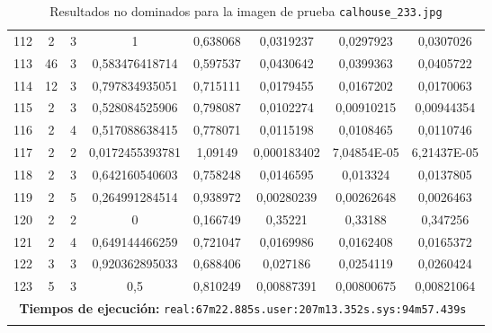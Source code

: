 \begin{longtable}{|c|c|c|c|c|c|c|c|}
112 & 2 & 3 & 1 & 0,638068 & 0,0319237 & 0,0297923 & 0,0307026  \\
113 & 46 & 3 & 0,583476418714 & 0,597537 & 0,0430642 & 0,0399363 & 0,0405722  \\
114 & 12 & 3 & 0,797834935051 & 0,715111 & 0,0179455 & 0,0167202 & 0,0170063  \\
115 & 2 & 3 & 0,528084525906 & 0,798087 & 0,0102274 & 0,00910215 & 0,00944354  \\
116 & 2 & 4 & 0,517088638415 & 0,778071 & 0,0115198 & 0,0108465 & 0,0110746  \\
117 & 2 & 2 & 0,0172455393781 & 1,09149 & 0,000183402 & 7,04854E-05 & 6,21437E-05  \\
118 & 2 & 3 & 0,642160540603 & 0,758248 & 0,0146595 & 0,013324 & 0,0137805  \\
119 & 2 & 5 & 0,264991284514 & 0,938972 & 0,00280239 & 0,00262648 & 0,0026463  \\
120 & 2 & 2 & 0 & 0,166749 & 0,35221 & 0,33188 & 0,347256  \\
121 & 2 & 4 & 0,649144466259 & 0,721047 & 0,0169986 & 0,0162408 & 0,0165372  \\
122 & 3 & 3 & 0,920362895033 & 0,688406 & 0,027186 & 0,0254119 & 0,0260424  \\
123 & 5 & 3 & 0,5 & 0,810249 & 0,00887391 & 0,00800675 & 0,00821064  \\
\hline
\multicolumn{8}{|c|}{\textbf{Tiempos de ejecución:} \texttt{real:67m22.885s.user:207m13.352s.sys:94m57.439s
}}\\  \hline
\caption{Resultados no dominados para la imagen de prueba \texttt{calhouse\_233.jpg}}
\label{tab:calhouse_233}
\end{longtable}
\normalsize

